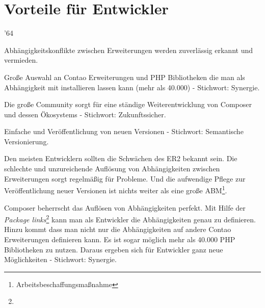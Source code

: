 \documentclass[
paper=a4,
draft=false,%
fontsize=10pt%
]{scrartcl}
\begin{document}
\newpage

%
%

\section{Vorteile für Entwickler}
\label{sec:pros-for-developers}

\begin{minipage}{.02\linewidth}
\end{minipage}
\begin{minipage}{.98\linewidth}
  \begin{dinglist}{'64}
  \item Abhängigkeitskonflikte zwischen Erweiterungen werden zuverlässig erkannt und vermieden.
  \item Große Auswahl an Contao Erweiterungen und PHP Bibliotheken die man als Abhängigkeit mit installieren lassen kann (mehr als 40.000) - Stichwort: Synergie.
  \item Die große Community sorgt für eine ständige Weiterentwicklung von Composer und dessen Ökosystems - Stichwort: Zukunftssicher.
  \item Einfache und  Veröffentlichung von neuen Versionen - Stichwort: Semantische Versionierung.
  \end{dinglist}
\end{minipage}

Den meisten Entwicklern sollten die Schwächen des ER2 bekannt sein. Die schlechte und unzureichende Auflösung von Abhängigkeiten zwischen Erweiterungen sorgt regelmäßig für Probleme. Und die aufwendige Pflege zur Veröffentlichung neuer Versionen ist nichts weiter als eine große ABM\footnote{Arbeitsbeschaffungsmaßnahme}.

Composer beherrscht das Auflösen von Abhängigkeiten perfekt. Mit Hilfe der \textit{Package links}\footnote{} kann man als Entwickler die Abhängigkeiten genau zu definieren. Hinzu kommt dass man nicht nur die Abhängigkeiten auf andere Contao Erweiterungen definieren kann. Es ist sogar möglich mehr als 40.000 PHP Bibliotheken zu nutzen. Daraus ergeben sich für Entwickler ganz neue Möglichkeiten - Stichwort: Synergie.
\end{document}
